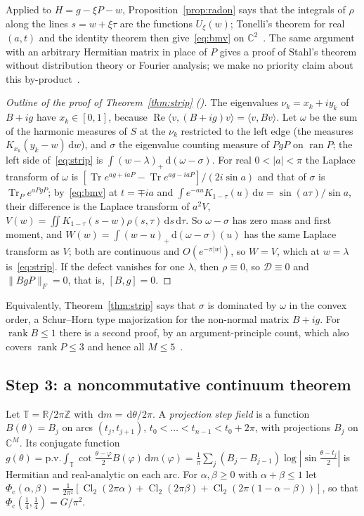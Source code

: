 \documentclass[11pt]{article}
\theoremstyle{remark}
\numberwithin{equation}{section}
\newcommand{\Z}{\mathbb{Z}}
\newcommand{\R}{\mathbb{R}}
\newcommand{\C}{\mathbb{C}}
\newcommand{\T}{\mathbb{T}}
\newcommand{\Tr}{\operatorname{Tr}}
\renewcommand{\Re}{\operatorname{Re}}
\newcommand{\Cl}{\operatorname{Cl}_2}
\newcommand{\ip}[2]{\langle #1,#2\rangle}
\newcommand{\cD}{\mathcal{D}}
\newcommand{\Phic}{\Phi_{\mathrm c}}
\newcommand{\dd}{\,\mathrm{d}}
\begin{document}
Applied to $H=g-\xi P-w$, Proposition~\ref{prop:radon} says that the integrals of $\rho$ along the lines $s=w+\xi\tau$
are the functions $U_\xi(w)$; Tonelli's theorem for real $(a,t)$ and the identity theorem then give~\eqref{eq:bmv} on
$\C^2$~\cite[Section~B.4]{MSmath}. The same argument with an arbitrary Hermitian matrix in place of $P$ gives a proof
of Stahl's theorem without distribution theory or Fourier analysis; we make no priority claim about this
by-product~\cite[Remark~B.8]{MSmath}.

\begin{proof}[Outline of the proof of Theorem~\ref{thm:strip} \textup{(\cite[Section~3.6]{MSmath})}]
The eigenvalues $\nu_k=x_k+iy_k$ of $B+ig$ have $x_k\in[0,1]$, because $\Re\ip v{(B+ig)v}=\ip v{Bv}$. Let $\omega$ be
the sum of the harmonic measures of $S$ at the $\nu_k$ restricted to the left edge (the measures $K_{x_k}(y_k-w)\dd w$),
and $\sigma$ the eigenvalue counting measure of $PgP$ on $\operatorname{ran}P$; the left side of~\eqref{eq:strip} is
$\int(w-\lambda)_+\dd(\omega-\sigma)$. For real $0<|a|<\pi$ the Laplace transform of $\omega$ is
$[\Tr e^{ag+iaP}-\Tr e^{ag-iaP}]/(2i\sin a)$ and that of $\sigma$ is $\Tr_Pe^{aPgP}$; by~\eqref{eq:bmv} at $t=\mp ia$
and $\int e^{-au}K_{1-\tau}(u)\dd u=\sin(a\tau)/\sin a$, their difference is the Laplace transform of $a^2V$,
$V(w)=\iint K_{1-\tau}(s-w)\rho(s,\tau)\dd s\dd\tau$. So $\omega-\sigma$ has zero mass and first moment, and
$W(w)=\int(w-u)_+\dd(\omega-\sigma)(u)$ has the same Laplace transform as $V$; both are continuous and
$O(e^{-\pi|w|})$, so $W=V$, which at $w=\lambda$ is~\eqref{eq:strip}. If the defect vanishes for one $\lambda$, then
$\rho\equiv0$, so $\cD\equiv0$ and $\|BgP\|_F=0$, that is, $[B,g]=0$.
\end{proof}

Equivalently, Theorem~\ref{thm:strip} says that $\sigma$ is dominated by $\omega$ in the convex order, a Schur--Horn
type majorization for the non-normal matrix $B+ig$. For $\operatorname{rank}B\le1$ there is a second proof, by an
argument-principle count, which also covers $\operatorname{rank}P\le3$ and hence all $M\le5$~\cite[Remark~3.10]{MSmath}.

\subsection{Step 3: a noncommutative continuum theorem}\label{subsec:continuum}
Let $\T=\R/2\pi\Z$ with $\dd m=\dd\theta/2\pi$. A \emph{projection step field} is a function $B(\theta)=B_j$ on arcs
$(t_j,t_{j+1})$, $t_0<\dots<t_{n-1}<t_0+2\pi$, with projections $B_j$ on $\C^M$. Its conjugate function
$g(\theta)=\mathrm{p.v.}\!\int_\T\cot\frac{\theta-\varphi}2B(\varphi)\dd m(\varphi)=\frac1\pi\sum_j(B_j-B_{j-1})\log|\sin\frac{\theta-t_j}2|$
is Hermitian and real-analytic on each arc. For $\alpha,\beta\ge0$ with $\alpha+\beta\le1$ let
$\Phic(\alpha,\beta)=\frac1{2\pi^2}[\Cl(2\pi\alpha)+\Cl(2\pi\beta)+\Cl(2\pi(1-\alpha-\beta))]$, so that
$\Phic(\frac14,\frac14)=G/\pi^2$.
\end{document}
